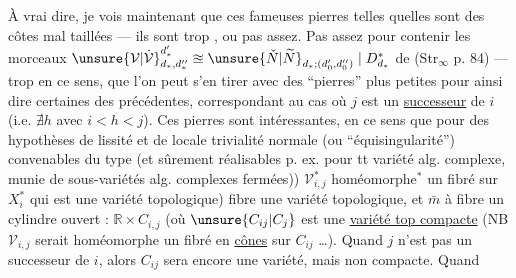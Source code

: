 À vrai dire, je vois maintenant que ces fameuses pierres telles quelles sont des côtes mal taillées — ils sont trop , ou pas assez. Pas assez pour contenir les morceaux $\unsure{\mathcal V|\dot{\mathcal V}}_{d_*,d''_*}^{d'_*}\approxeq\unsure{\check N|\widetilde N}_{d_*;(d'_0,d''_0)}\mid D_{d_*}^*$ de ($\mathrm{Str}_\infty$ p. 84) — trop en ce sens, que l'on peut s'en tirer avec des ``pierres'' plus petites pour ainsi dire certaines des précédentes, correspondant au cas où $j$ est un \uline{successeur} de $i$ (i.e. $\nexists h$ avec $i<h<j$).
Ces pierres sont  intéressantes, en ce sens que pour des hypothèses de lissité et de locale trivialité normale (ou ``équisingularité'') convenables du type  (et sûrement réalisables p. ex. pour tt variété alg. complexe, munie de sous-variétés alg. complexes fermées)) $\mathcal V_{i,j}^*$  homéomorphe$ {}^*$  un fibré sur $X_i^*$ \unsure{(}qui est une variété topologique)  fibre une variété topologique, et $\bar m$ à fibre un cylindre ouvert : $\mathbb R\times C_{i,j}$  (où $\unsure{C_{ij}|C_j}$ est une \uline{variété top compacte} (NB $\mathcal V_{i,j}$ serait homéomorphe  un fibré en \uline{cônes} sur $C_{ij}$ \ldots). Quand $j$ n'est pas un successeur de $i$, alors $C_{ij}$ sera encore une variété, mais non compacte. Quand


